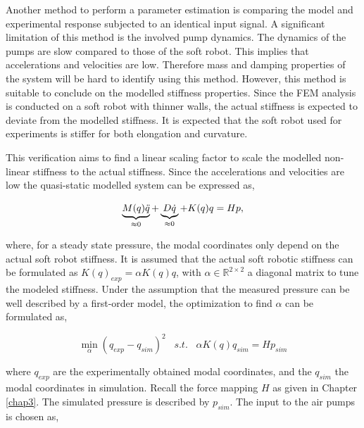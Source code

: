 Another method to perform a parameter estimation is comparing the model and experimental response subjected to an identical input signal. A significant limitation of this method is the involved pump dynamics. The dynamics of the pumps are slow compared to those of the soft robot. This implies that accelerations and velocities are low. Therefore mass and damping properties of the system will be hard to identify using this method. However, this method is suitable to conclude on the modelled stiffness properties. Since the FEM analysis is conducted on a soft robot with thinner walls, the actual stiffness is expected to deviate from the modelled stiffness. It is expected that the soft robot used for experiments is stiffer for both elongation and curvature. 

This verification aims to find a linear scaling factor to scale the modelled non-linear stiffness to the actual stiffness. Since the accelerations and velocities are low the quasi-static modelled system can be expressed as,

\begin{equation}
   \underbrace{M(q) \Ddot{q}}_{\approx 0} + \underbrace{D \dot{q}}_{\approx 0} + K(q) q = Hp,
\end{equation}

where, for a steady state pressure, the modal coordinates only depend on the actual soft robot stiffness. It is assumed that the actual soft robotic stiffness can be formulated as $K(q)_{exp} = \alpha K(q)q$, with $\alpha \in \mathbb{R}^{2\times 2}$ a diagonal matrix to tune the modeled stiffness. Under the assumption that the measured pressure can be well described by a first-order model, the optimization to find $\alpha$ can be formulated as, 

\begin{equation}
    \min_{\alpha} (q_{exp} - q_{sim})^2 \hspace{10pt} s.t. \hspace{10pt} \alpha K(q) q_{sim} = Hp_{sim}
    \label{eq5:optalpha}
\end{equation}

where $q_{exp}$ are the experimentally obtained modal coordinates, and the $q_{sim}$ the modal coordinates in simulation. Recall the force mapping $H$ as given in Chapter \ref{chap3}. The simulated pressure is described by $p_{sim}$. The input to the air pumps is chosen as,

